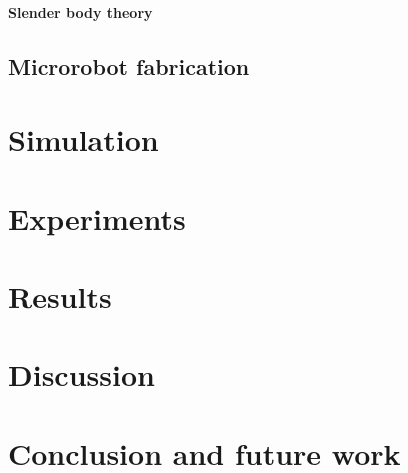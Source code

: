 \documentclass[12pt,a4paper,titlepage]{report}
\begin{document}
\subsubsection{Slender body theory}\label{method1}


\section{Microrobot fabrication}
\subsection{}







\chapter{Simulation}



\chapter{Experiments}




\chapter{Results}



\chapter{Discussion}




\chapter{Conclusion and future work}






\renewcommand{\bibname}{References}

 
\end{document}
